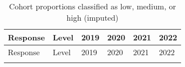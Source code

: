 \documentclass[
  single column]{article}
\begin{document}
\begin{longtable}[]{@{}
  >{\raggedright\arraybackslash}p{}
  >{\raggedright\arraybackslash}p{}
  >{\raggedright\arraybackslash}p{}
  >{\raggedright\arraybackslash}p{}
  >{\raggedright\arraybackslash}p{}
  >{\raggedright\arraybackslash}p{}@{}}
\caption{Cohort proportions classified as low, medium, or high
(imputed)}\label{tbl-sample-cat-imp}\tabularnewline
\toprule\noalign{}
\begin{minipage}[b]{\linewidth}\raggedright
Response
\end{minipage} & \begin{minipage}[b]{\linewidth}\raggedright
Level
\end{minipage} & \begin{minipage}[b]{\linewidth}\raggedright
2019
\end{minipage} & \begin{minipage}[b]{\linewidth}\raggedright
2020
\end{minipage} & \begin{minipage}[b]{\linewidth}\raggedright
2021
\end{minipage} & \begin{minipage}[b]{\linewidth}\raggedright
2022
\end{minipage} \\
\midrule\noalign{}
\endfirsthead
\toprule\noalign{}
\begin{minipage}[b]{\linewidth}\raggedright
Response
\end{minipage} & \begin{minipage}[b]{\linewidth}\raggedright
Level
\end{minipage} & \begin{minipage}[b]{\linewidth}\raggedright
2019
\end{minipage} & \begin{minipage}[b]{\linewidth}\raggedright
2020
\end{minipage} & \begin{minipage}[b]{\linewidth}\raggedright
2021
\end{minipage} & \begin{minipage}[b]{\linewidth}\raggedright
2022
\end{minipage} \\
\midrule\noalign{}
\endhead

\end{longtable}
\end{document}
